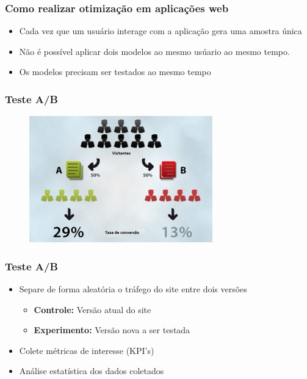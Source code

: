 \documentclass[xcolor=dvipsnames]{beamer}
\begin{document}
\begin{frame}%
\frametitle{Como realizar otimização em aplicações web}

\begin{itemize}
\item<1-> Cada vez que um usuário interage com a aplicação gera uma amostra única
\item<2-> Não é possível aplicar dois modelos ao mesmo usúario ao mesmo tempo.
\item<3-> Os modelos precisam ser testados ao mesmo tempo
\end{itemize}

\end{frame}%


\begin{frame}%
\frametitle{Teste A/B}

\begin{figure}
\centering
\includegraphics[scale=.8]{img/teste_ab.jpg}
\end{figure}
\end{frame}

\begin{frame}%
\frametitle{Teste A/B}

\begin{itemize}
\item Separe de forma aleatória o tráfego do site entre dois versões

\begin{itemize}
	\item \textbf{Controle:} Versão atual do site
	\item \textbf{Experimento:} Versão nova a ser testada
\end{itemize}

\vspace{10pt}\item Colete métricas de interesse (KPI's)

\vspace{10pt}\item Análise estatística dos dados coletados

\end{itemize}
\end{frame}%
\end{document}
